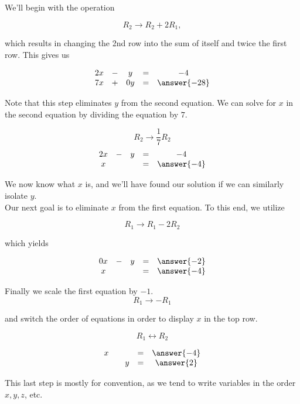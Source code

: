 \documentclass{ximera}
\begin{document}
\begin{exploration}
\begin{example}
    We'll begin with the operation
    
    $$R_2\rightarrow R_2+2R_1,$$
    
    which results in changing the 2nd row into the sum of itself and twice the first row.  This gives us
     
    $$ \begin{matrix}
          2x& -&y&=&-4\\
          7x & +&0y&= &\answer{-28} 
        \end{matrix}$$
     
    Note that this step eliminates $y$ from the second equation. We can solve for $x$ in the second equation by dividing the equation by $7$. 
    
    $$R_2\rightarrow \frac{1}{7}R_2$$
    $$\begin{matrix}
           2x& -&y&=&-4\\
          x & &&= &\answer{-4}
           \end{matrix}$$
       
    We now know what $x$ is, and we'll have found our solution if we can similarly isolate $y$. \\
    
    Our next goal is to eliminate $x$ from the first equation.  To this end, we utilize
    
    $$R_1\rightarrow R_1-2R_2$$

    which yields
     
    $$\begin{matrix}
         0x& -&y&=&\answer{-2}\\
         x & &&= &\answer{-4} \\
        \end{matrix}$$
     
    Finally we scale the first equation by $-1$. $$R_1\rightarrow -R_1$$
         
    and switch the order of equations in order to display $x$ in the top row. 
    
    $$R_1\leftrightarrow R_2$$ 
     
    $$\begin{matrix}
          x & &&= &\answer{-4}\\
          & &y&=&\answer{2}     
        \end{matrix}$$
    
    This last step is mostly for convention, as we tend to write variables in the order $x, y, z$, etc.
       

\end{example}
\end{exploration}
\end{document}
